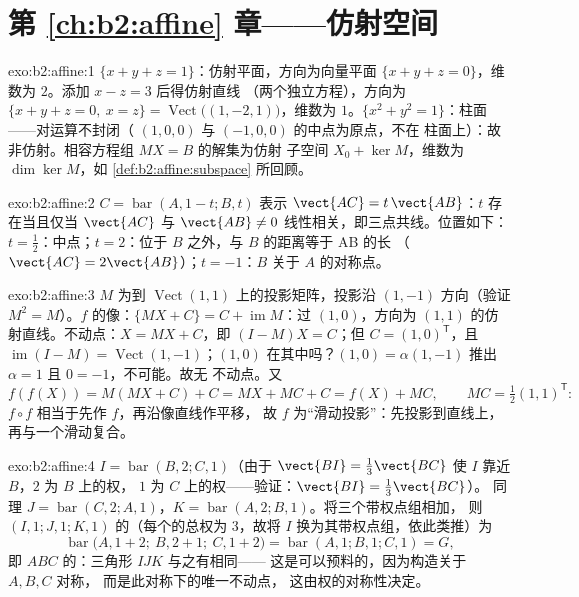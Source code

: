 \section*{第 \ref{ch:b2:affine} 章——仿射空间}

\begin{solution}{exo:b2:affine:1}
$\{x + y + z = 1\}$：仿射平面，方向为向量平面 $\{x
+ y + z = 0\}$，维数为 $2$。添加 $x - z = 3$ 后得仿射直线
（两个独立方程），方向为 $\{x + y + z = 0,\ x = z\}
= \operatorname{Vect}\bigl((1, -2, 1)\bigr)$，维数为 $1$。$\{x^2
+ y^2 = 1\}$：柱面——对运算不封闭（
$(1,0,0)$ 与 $(-1,0,0)$ 的中点为原点，不在
柱面上）：故非仿射。相容方程组 $MX = B$ 的解集为仿射
子空间 $X_0 + \ker M$，维数为 $\dim\ker M$，如
\cref{def:b2:affine:subspace} 所回顾。
\end{solution}

\begin{solution}{exo:b2:affine:2}
$C = \operatorname{bar}(A, 1-t; B, t)$ 表示 $\vect{AC} =
t\,\vect{AB}$：$t$ 存在当且仅当
$\vect{AC}$ 与 $\vect{AB} \neq 0$ 线性相关，即三点共线。位置如下：$t
= \frac12$：中点；$t = 2$：位于 $B$ 之外，与 $B$ 的距离等于 AB 的长
（$\vect{AC} = 2\vect{AB}$）；$t = -1$：$B$ 关于
$A$ 的对称点。
\end{solution}

\begin{solution}{exo:b2:affine:3}
$M$ 为到 $\operatorname{Vect}(1,1)$ 上的投影矩阵，投影沿
$(1,-1)$ 方向（验证 $M^2 = M$）。$f$ 的像：$\{MX + C\} = C +
\operatorname{im} M$：过 $(1,0)$，方向为
$(1,1)$ 的仿射直线。不动点：$X = MX + C$，即 $(I - M)X = C$；但 $C =
(1, 0)^{\mathsf T}$，且 $\operatorname{im}(I - M) =
\operatorname{Vect}(1,-1)$；$(1,0)$ 在其中吗？$(1, 0) =
\alpha(1,-1)$ 推出 $\alpha = 1$ 且 $0 = -1$，不可能。故无
不动点。又
\[
f(f(X)) = M(MX + C) + C = MX + MC + C = f(X) + MC,
\qquad MC = \tfrac12(1,1)^{\mathsf T} :
\]
$f\circ f$ 相当于先作 $f$，再沿像直线作平移，
故 $f$ 为“滑动投影”：先投影到直线上，
再与一个滑动复合。
\end{solution}

\begin{solution}{exo:b2:affine:4}
$I = \operatorname{bar}(B, 2; C, 1)$（由于 $\vect{BI} =
\frac13\vect{BC}$ 使 $I$ 靠近 $B$，$2$ 为 $B$ 上的权，
$1$ 为 $C$ 上的权——验证：$\vect{BI} = \frac{1}{3}\vect{BC}$）。
同理 $J = \operatorname{bar}(C, 2; A, 1)$，$K =
\operatorname{bar}(A, 2; B, 1)$。将三个带权点组相加，
则 $(I, 1; J, 1; K, 1)$ 的（每个的总权为
$3$，故将 $I$ 换为其带权点组，依此类推）为
\[
\operatorname{bar}\bigl(A, 1 + 2;\ B, 2 + 1;\ C, 1 + 2\bigr)
= \operatorname{bar}(A, 1; B, 1; C, 1) = G ,
\]
即 $ABC$ 的：三角形 $IJK$ 与之有相同——
这是可以预料的，因为构造关于 $A, B, C$ 对称，
而是此对称下的唯一不动点，
这由权的对称性决定。
\end{solution}

